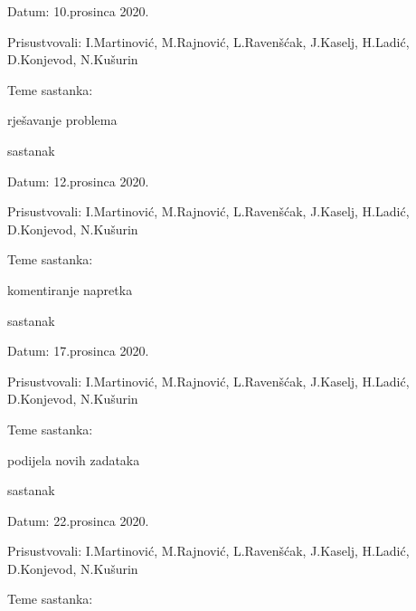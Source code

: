 \begin{packed_enum}
				\item[] \begin{packed_item}
				\item Datum: 10.prosinca 2020.
				\item Prisustvovali: I.Martinović, M.Rajnović, L.Ravenšćak, J.Kaselj, H.Ladić, D.Konjevod, N.Kušurin
				\item Teme sastanka: 
				\begin{packed_item}
					\item   rješavanje problema
				\end{packed_item}
			\end{packed_item}
		\item sastanak
						\item[] \begin{packed_item}
			\item Datum: 12.prosinca 2020.
			\item Prisustvovali: I.Martinović, M.Rajnović, L.Ravenšćak, J.Kaselj, H.Ladić, D.Konjevod, N.Kušurin
			\item Teme sastanka: 
			\begin{packed_item}
				\item   komentiranje napretka
			\end{packed_item}
		\end{packed_item}
			\item sastanak
							\item[] \begin{packed_item}
				\item Datum: 17.prosinca 2020.
				\item Prisustvovali: I.Martinović, M.Rajnović, L.Ravenšćak, J.Kaselj, H.Ladić, D.Konjevod, N.Kušurin
				\item Teme sastanka: 
				\begin{packed_item}
					\item   podijela novih zadataka
				\end{packed_item}
			\end{packed_item}
		\item sastanak
						\item[] \begin{packed_item}
			\item Datum: 22.prosinca 2020.
			\item Prisustvovali: I.Martinović, M.Rajnović, L.Ravenšćak, J.Kaselj, H.Ladić, D.Konjevod, N.Kušurin
			\item Teme sastanka: 
			\begin{packed_item}

\end{packed_item}
\end{packed_item}
\end{packed_enum}
